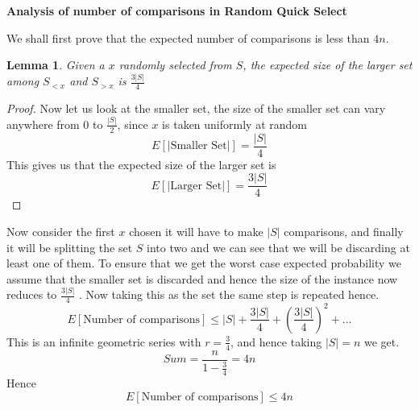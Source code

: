 \documentclass{assignment}
\date{August 29, 2011}
\begin{document}
\begin{problemlist}
\pbitem
\begin{problem} 
\textbf{Analysis of number of comparisons in Random Quick Select}
\begin{answer}
We shall first prove that the expected number of comparisons is less than $4n$. 

\newtheorem{lemsplit}{Lemma}
\begin{lemsplit}
Given a $x$ randomly selected from $S$, the expected size of the larger set among $S_{<x}$ and $S_{>x}$ is $\frac{3|S|}{4}$
\end{lemsplit}
\begin{proof}
Now let us look at the smaller set, the size of the smaller set can vary anywhere from $0$ to $\frac{|S|}{2}$, since $x$ is taken uniformly at random 
\begin{equation}
 E [ \textrm{|Smaller Set|}]=\frac{|S|}{4}
\end{equation}
This gives us that the expected size of the larger set is 
\begin{equation}
 E [ \textrm{|Larger Set|}]=\frac{3|S|}{4}
\end{equation}
\end{proof}
Now consider the first $x$ chosen it will have to make $|S|$ comparisons, and finally it will be splitting the set $S$ into two and we can see that we will be discarding at least one of them. To ensure that we get the worst case expected probability we assume that the smaller set is discarded and hence the size of the instance now reduces to $\frac{3|S|}{4}$ . Now taking this as the set the same step is repeated hence.
\begin{equation}
 E [ \textrm{Number of comparisons}] \leq |S| + \frac{3|S|}{4} + \left(\frac{3|S|}{4} \right)^2 + \ldots
\end{equation}
This is an infinite geometric series with $r=\frac{3}{4}$, and hence taking $|S|=n$ we get. 
\begin{equation}
Sum = \frac{n}{1-\frac{3}{4}} = 4n
\end{equation}
Hence 
\begin{equation}
 E [ \textrm{Number of comparisons}] \leq 4n
\end{equation}
$ $ \\





\end{answer}


\end{problem}


\end{problemlist}
\end{document}
